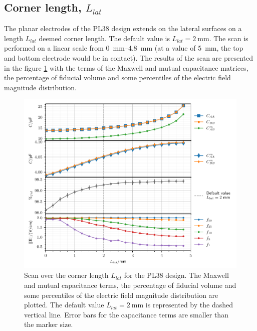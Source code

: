 

\subsection{Corner length, $L_{lat}$}

The planar electrodes of the PL38 design extends on the lateral surfaces on a length $L_{lat}$ deemed corner length. The default value is $L_{lat} = \SI{2}{\mm}$. The scan is performed on a linear scale from \SIrange{0}{4.8}{\mm} (at a value of \SI{5}{\mm}, the top and bottom electrode would be in contact). The results of the scan are presented in the figure \ref{fig:capacitance-fiducial-corner-length} with the terms of the Maxwell and mutual capacitance matrices, the percentage of fiducial volume and some percentiles of the electric field magnitude distribution.

\begin{figure}
\centering
\includegraphics[scale=1]{Figures/ElectrodesScan/capacitance_fiducial_corner_length.pdf}
\caption{Scan over the corner length $L_{lat}$ for the PL38 design. The Maxwell and mutual capacitance terms, the percentage of fiducial volume and some percentiles of the electric field magnitude distribution are plotted. The default value $L_{lat}=\SI{2}{\mm}$ is represented by the dashed vertical line. Error bars for the capacitance terms are smaller than the marker size.}
\label{fig:capacitance-fiducial-corner-length}
\end{figure}

